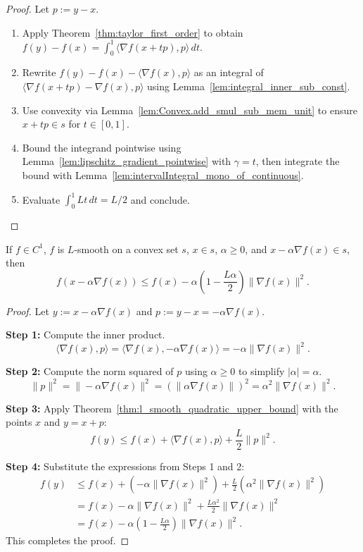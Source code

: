 \begin{proof}
  \leanok{}
  Let $p:=y-x$.
  \begin{enumerate}
    \item Apply Theorem~\ref{thm:taylor_first_order} to obtain
    $f(y)-f(x)=\int_0^1\langle \nabla f(x+t p),p\rangle\,dt$.
    \item Rewrite
    $f(y)-f(x)-\langle \nabla f(x),p\rangle$
    as an integral of
    $\langle \nabla f(x+t p)-\nabla f(x),p\rangle$
    using Lemma~\ref{lem:integral_inner_sub_const}.
    \item Use convexity via Lemma~\ref{lem:Convex.add_smul_sub_mem_unit} to ensure $x+t p\in s$ for $t\in[0,1]$.
    \item Bound the integrand pointwise using Lemma~\ref{lem:lipschitz_gradient_pointwise} with $\gamma=t$,
    then integrate the bound with Lemma~\ref{lem:intervalIntegral_mono_of_continuous}.
    \item Evaluate $\int_0^1 Lt\,dt=L/2$ and conclude.%
  \end{enumerate}
\end{proof}

\begin{theorem}\label{thm:gradient_descent_one_step}
  \leanok{}
  If $f \in C^1$, $f$ is $L$-smooth on a convex set $s$, $x \in s$, $\alpha \geq 0$, and
  $x - \alpha \nabla f(x) \in s$, then
  \[
    f(x - \alpha \nabla f(x)) \le f(x) - \alpha\left(1 - \frac{L\alpha}{2}\right) \|\nabla f(x)\|^2.
  \]
\end{theorem}
\begin{proof}
  \leanok{}
  Let $y := x - \alpha \nabla f(x)$ and $p := y - x = -\alpha \nabla f(x)$.

  \textbf{Step 1:} Compute the inner product.
  \[
    \langle \nabla f(x), p \rangle = \langle \nabla f(x), -\alpha \nabla f(x) \rangle = -\alpha \|\nabla f(x)\|^2.
  \]

  \textbf{Step 2:} Compute the norm squared of $p$ using $\alpha \ge 0$ to simplify $|\alpha| = \alpha$.
  \[
    \|p\|^2 = \|-\alpha \nabla f(x)\|^2 = (\|\alpha \nabla f(x)\|)^2 = \alpha^2 \|\nabla f(x)\|^2.
  \]

  \textbf{Step 3:} Apply Theorem~\ref{thm:l_smooth_quadratic_upper_bound} with the points $x$ and $y = x + p$:
  \[
    f(y) \le f(x) + \langle \nabla f(x), p \rangle + \frac{L}{2} \|p\|^2.
  \]

  \textbf{Step 4:} Substitute the expressions from Steps 1 and 2:
  \begin{align*}
    f(y) &\le f(x) + (-\alpha \|\nabla f(x)\|^2) + \frac{L}{2}(\alpha^2 \|\nabla f(x)\|^2) \\
    &= f(x) - \alpha \|\nabla f(x)\|^2 + \frac{L\alpha^2}{2} \|\nabla f(x)\|^2 \\
    &= f(x) - \alpha\left(1 - \frac{L\alpha}{2}\right) \|\nabla f(x)\|^2.
  \end{align*}
  This completes the proof.
\end{proof}


